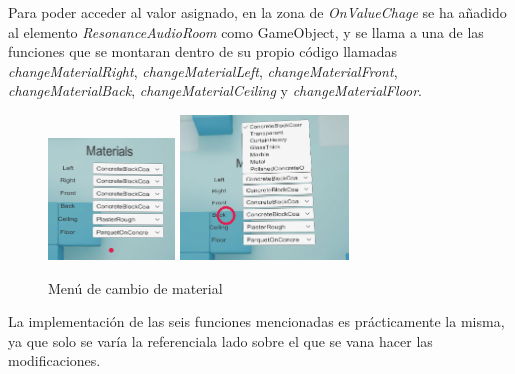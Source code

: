 \quad Para poder acceder al valor asignado, en la zona de \textit{OnValueChage} se ha añadido al elemento \textit{ResonanceAudioRoom} como GameObject, y se llama a una de las funciones que se montaran dentro de su propio código llamadas \textit{changeMaterialRight}, \textit{changeMaterialLeft}, \textit{changeMaterialFront}, \textit{changeMaterialBack}, \textit{changeMaterialCeiling} y \textit{changeMaterialFloor}.\\

\begin{figure}[htb]
	\centering
	\includegraphics[width=0.3\textwidth]{./imagenes/materialMenu}
	\includegraphics[width=0.4\textwidth]{./imagenes/materialMenuDeploy}
	\caption{Menú de cambio de material}
\end{figure} 

\newpage

\quad La implementación de las seis funciones mencionadas es prácticamente la misma, ya que solo se varía la referenciala lado sobre el que se vana  hacer las modificaciones.\\

